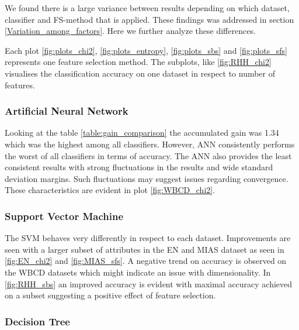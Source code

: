 We found there is a large variance between results depending on which dataset, classifier and FS-method that is applied. These findings was addressed in section \ref{Variation_among_factors}. Here we further analyze these differences.

Each plot \ref{fig:plots_chi2}, \ref{fig:plots_entropy}, \ref{fig:plots_sbs} and \ref{fig:plots_sfs} represents one feature selection method. The subplots, like \ref{fig:RHH_chi2} visualises the classification accuracy on one dataset in respect to number of features.

\begin{table}[hp]
  
  \caption[]%
  {{\small Ranking of which classifiers gained most accuracy when comparing feature selection to full dataset.}}
  \label{table:gain_comparison}
\end{table}

\subsubsection{Artificial Neural Network}

Looking at the table \ref{table:gain_comparison} the accumulated gain was 1.34 which was the highest among all classifiers. However, ANN consistently performs the worst of all classifiers in terms of accuracy. The ANN also provides the least consistent results with strong fluctuations in the results and wide standard deviation margins. Such fluctuations may suggest issues regarding convergence. These characteristics are evident in plot \ref{fig:WBCD_chi2}.



\subsubsection{Support Vector Machine}

The SVM behaves very differently in respect to each dataset. Improvements are seen with a larger subset of attributes in the EN and MIAS dataset as seen in \ref{fig:EN_chi2} and \ref{fig:MIAS_sfs}. A negative trend on accuracy is observed on the WBCD datasets which might indicate an issue with dimensionality. In \ref{fig:RHH_sbs} an improved accuracy is evident with maximal accuracy achieved on a subset suggesting a positive effect of feature selection.



\subsubsection{Decision Tree}

